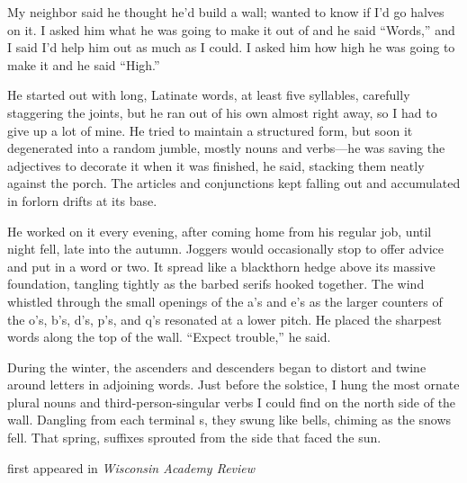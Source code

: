 
My neighbor said he thought he'd build a wall; wanted to know if I'd go
halves on it. I asked him what he was going to make it out of and he
said ``Words,'' and I said I'd help him out as much as I could. I asked
him how high he was going to make it and he said ``High.''

He started out with long, Latinate words, at least five syllables,
carefully staggering the joints, but he ran out of his own almost right
away, so I had to give up a lot of mine. He tried to maintain a
structured form, but soon it degenerated into a random jumble, mostly
nouns and verbs---he was saving the adjectives to decorate it when it
was finished, he said, stacking them neatly against the porch. The
articles and conjunctions kept falling out and accumulated in forlorn
drifts at its base.

He worked on it every evening, after coming home from his regular job,
until night fell, late into the autumn. Joggers would occasionally stop
to offer advice and put in a word or two. It spread like a blackthorn
hedge above its massive foundation, tangling tightly as the barbed
serifs hooked together. The wind whistled through the small openings of
the a's and e's as the larger counters of the o's, b's, d's, p's, and
q's resonated at a lower pitch. He placed the sharpest words along the
top of the wall. ``Expect trouble,'' he said.

During the winter, the ascenders and descenders began to distort and
twine around letters in adjoining words. Just before the solstice, I
hung the most ornate plural nouns and third-person-singular verbs I
could find on the north side of the wall. Dangling from each terminal s,
they swung like bells, chiming as the snows fell. That spring, suffixes
sprouted from the side that faced the sun.

first appeared in \emph{Wisconsin Academy Review}
